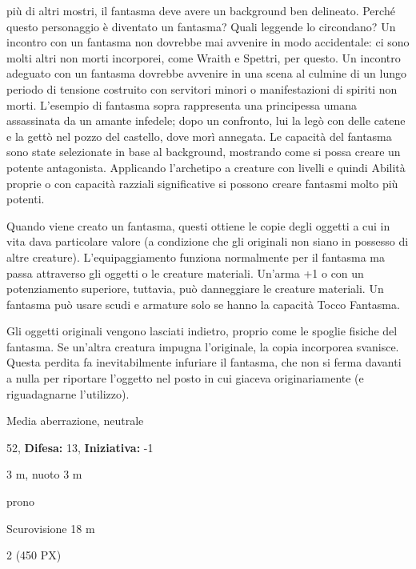 \begin{multicols}{2}
{più di altri mostri, il fantasma deve avere un background ben delineato. Perché questo personaggio è diventato un fantasma? Quali leggende lo circondano? Un incontro con un fantasma non dovrebbe mai avvenire in modo accidentale: ci sono molti altri non morti incorporei, come Wraith e Spettri, per questo. Un incontro adeguato con un fantasma dovrebbe avvenire in una scena al culmine di un lungo periodo di tensione costruito con servitori minori o manifestazioni di spiriti non morti. L'esempio di fantasma sopra rappresenta una principessa umana assassinata da un amante infedele; dopo un confronto, lui la legò con delle catene e la gettò nel pozzo del castello, dove morì annegata. Le capacità del fantasma sono state selezionate in base al background, mostrando come si possa creare un potente antagonista. Applicando l'archetipo a creature con livelli e quindi Abilità proprie o con capacità razziali significative si possono creare fantasmi molto più potenti.

Quando viene creato un fantasma, questi ottiene le copie degli oggetti a cui in vita dava particolare valore (a condizione che gli originali non siano in possesso di altre creature). L'equipaggiamento funziona normalmente per il fantasma ma passa attraverso gli oggetti o le creature materiali. Un'arma +1 o con un potenziamento superiore, tuttavia, può danneggiare le creature materiali. Un fantasma può usare scudi e armature solo se hanno la capacità Tocco Fantasma.

Gli oggetti originali vengono lasciati indietro, proprio come le spoglie fisiche del fantasma. Se un'altra creatura impugna l'originale, la copia incorporea svanisce. Questa perdita fa inevitabilmente infuriare il fantasma, che non si ferma davanti a nulla per riportare l'oggetto nel posto in cui giaceva originariamente (e riguadagnarne l'utilizzo).

\noindent
\begin{description}[noitemsep, topsep=0pt, parsep=0pt, partopsep=0pt, leftmargin=0cm, labelwidth=2.2cm]
	\item[\textbf{Taglia/Tipo:}] Media aberrazione, neutrale
	\item[\textbf{Caratt.:}] 
	\item[\textbf{Punti Ferita:}] 52,  \textbf{Difesa:} 13,  \textbf{Iniziativa:} -1
	\item[\textbf{Movimento:}] 3 m, nuoto 3 m
	\item[\textbf{Tiri Salvez.:}] 
	\item[\textbf{Immunità:}] prono
	\item[\textbf{Sensi:}] Scurovisione 18 m
	\item[\textbf{Sfida:}] 2 (450 PX)\smallskip
\end{description}

}
\end{multicols}
